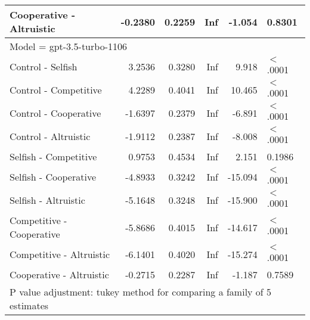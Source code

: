 \begin{table}[ht]
\begin{tabular}{lrrrrl}
  Cooperative - Altruistic & -0.2380 & 0.2259 & Inf & -1.054 & 0.8301 \\ 
   \hline
\multicolumn{6}{l}{Model = gpt-3.5-turbo-1106}\\
Control - Selfish & 3.2536 & 0.3280 & Inf & 9.918 & $<$.0001 \\ 
  Control - Competitive & 4.2289 & 0.4041 & Inf & 10.465 & $<$.0001 \\ 
  Control - Cooperative & -1.6397 & 0.2379 & Inf & -6.891 & $<$.0001 \\ 
  Control - Altruistic & -1.9112 & 0.2387 & Inf & -8.008 & $<$.0001 \\ 
  Selfish - Competitive & 0.9753 & 0.4534 & Inf & 2.151 & 0.1986 \\ 
  Selfish - Cooperative & -4.8933 & 0.3242 & Inf & -15.094 & $<$.0001 \\ 
  Selfish - Altruistic & -5.1648 & 0.3248 & Inf & -15.900 & $<$.0001 \\ 
  Competitive - Cooperative & -5.8686 & 0.4015 & Inf & -14.617 & $<$.0001 \\ 
  Competitive - Altruistic & -6.1401 & 0.4020 & Inf & -15.274 & $<$.0001 \\ 
  Cooperative - Altruistic & -0.2715 & 0.2287 & Inf & -1.187 & 0.7589 \\ 
   \hline
\multicolumn{6}{l}{{\footnotesize P value adjustment: tukey method for comparing a family of 5 estimates}}\\
\end{tabular}
\end{table}
